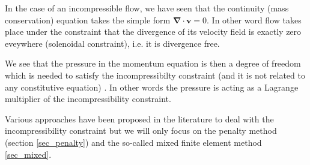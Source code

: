 
In the case of an incompressible flow, we have seen that the continuity (mass conservation)
equation takes the simple form ${\bm \nabla}\cdot{\bm v}=0$. In other word flow takes place 
under the constraint that the divergence of its velocity field is exactly zero eveywhere 
(solenoidal constraint), i.e. it is divergence free. 

We see that the pressure in the momentum equation is then a degree of freedom which is needed 
to satisfy the incompressibilty constraint (and it is not related to any constitutive equation)
\cite{dohu}. In other words the pressure is acting as a Lagrange multiplier of the incompressibility
constraint. 

Various approaches have been proposed in the literature to deal with the 
incompressibility constraint but we will only focus on the penalty method 
(section \ref{sec_penalty}) and the so-called mixed finite element method
\ref{sec_mixed}.
